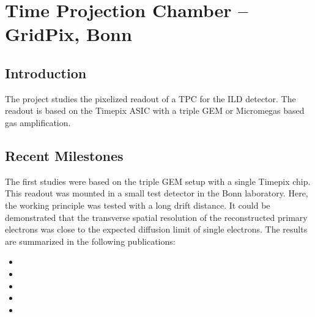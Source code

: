 \section{Time Projection Chamber -- GridPix, Bonn}
\subsection{Introduction}
The project studies the pixelized readout of a TPC for the ILD detector. The readout is based on the Timepix ASIC with a triple GEM or Micromegas based gas amplification.

\subsection{Recent Milestones}
The first studies were based on the triple GEM setup with a single Timepix chip. This readout was mounted in a small test detector in the Bonn laboratory. Here, the working principle was tested with a long drift distance. It could be demonstrated that the transverse spatial resolution of the reconstructed primary electrons was close to the expected diffusion limit of single electrons. The results are summarized in the following publications:
\begin{itemize}
\item {}
\item {}
\item {}
\item {}
\item {}
\end{itemize}

